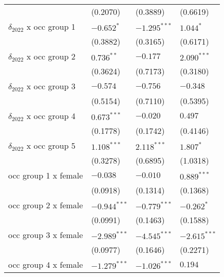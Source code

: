 \begin{tabular}{llll}
                                       &           (0.2070) &           (0.3889) &           (0.6619) \\
$\delta_{2022}$ x occ group 1          &         $-0.652^*$ &     $-1.295^{***}$ &          $1.044^*$ \\
                                       &           (0.3882) &           (0.3165) &           (0.6171) \\
$\delta_{2022}$ x occ group 2          &       $0.736^{**}$ &           $-0.177$ &      $2.090^{***}$ \\
                                       &           (0.3624) &           (0.7173) &           (0.3180) \\
$\delta_{2022}$ x occ group 3          &           $-0.574$ &           $-0.756$ &           $-0.348$ \\
                                       &           (0.5154) &           (0.7110) &           (0.5395) \\
$\delta_{2022}$ x occ group 4          &      $0.673^{***}$ &           $-0.020$ &            $0.497$ \\
                                       &           (0.1778) &           (0.1742) &           (0.4146) \\
$\delta_{2022}$ x occ group 5          &      $1.108^{***}$ &      $2.118^{***}$ &          $1.807^*$ \\
                                       &           (0.3278) &           (0.6895) &           (1.0318) \\
occ group 1 x female                   &           $-0.038$ &           $-0.010$ &      $0.889^{***}$ \\
                                       &           (0.0918) &           (0.1314) &           (0.1368) \\
occ group 2 x female                   &     $-0.944^{***}$ &     $-0.779^{***}$ &         $-0.262^*$ \\
                                       &           (0.0991) &           (0.1463) &           (0.1588) \\
occ group 3 x female                   &     $-2.989^{***}$ &     $-4.545^{***}$ &     $-2.615^{***}$ \\
                                       &           (0.0977) &           (0.1646) &           (0.2271) \\
occ group 4 x female                   &     $-1.279^{***}$ &     $-1.026^{***}$ &            $0.194$ \\

\end{tabular}
